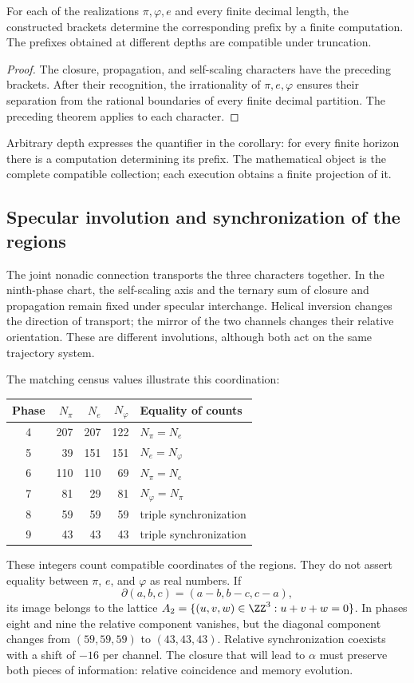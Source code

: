 \begin{corollary}
\label{gen:prefijos-regionales}
For each of the realizations \(\pi,\varphi,e\) and every finite
decimal length, the constructed brackets determine the corresponding prefix
by a finite computation. The prefixes obtained at different depths
are compatible under truncation.
\end{corollary}
\begin{proof}
The closure, propagation, and self-scaling characters have the
preceding brackets. After their recognition, the irrationality of \(\pi,e,\varphi\)
ensures their separation from the rational boundaries of every finite decimal
partition. The preceding theorem applies to each character.
\end{proof}
Arbitrary depth expresses the quantifier in the corollary: for every
finite horizon there is a computation determining its prefix. The mathematical
object is the complete compatible collection; each execution obtains a
finite projection of it.

\subsection{Specular involution and synchronization of the regions}

The joint nonadic connection transports the three characters together. In the ninth-phase chart, the self-scaling axis and the ternary sum of closure and propagation remain fixed under specular interchange. Helical inversion changes the direction of transport; the mirror of the two channels changes their relative orientation. These are different involutions, although both act on the same trajectory system.

The matching census values illustrate this coordination:
\begin{center}
\begin{tabular}{@{}c rrr l@{}}\toprule
Phase&\(N_\pi\)&\(N_e\)&\(N_\varphi\)&Equality of counts\\\midrule
4&207&207&122&\(N_\pi=N_e\)\\
5&39&151&151&\(N_e=N_\varphi\)\\
6&110&110&69&\(N_\pi=N_e\)\\
7&81&29&81&\(N_\varphi=N_\pi\)\\
8&59&59&59&triple synchronization\\
9&43&43&43&triple synchronization\\\bottomrule
\end{tabular}
\end{center}
These integers count compatible coordinates of the regions. They do not assert equality between \(\pi\), \(e\), and \(\varphi\) as real numbers. If
\[
 \partial(a,b,c)=(a-b,b-c,c-a),
\]
its image belongs to the lattice \(A_2=\{(u,v,w)\in\ZZ^3:u+v+w=0\}\). In phases eight and nine the relative component vanishes, but the diagonal component changes from \((59,59,59)\) to \((43,43,43)\). Relative synchronization coexists with a shift of \(-16\) per channel. The closure that will lead to \(\alpha\) must preserve both pieces of information: relative coincidence and memory evolution.

